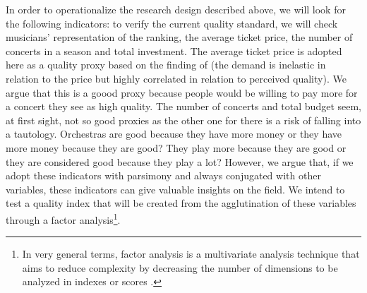 \documentclass[a4paper, 12pt, openright, oneside, german, french, brazil, english, article]{abntex2}
\begin{document}
	
	In order to operationalize the research design described above, we will look for the following indicators: to verify the current quality standard, we will check musicians' representation of the ranking, the average ticket price, the number of concerts in a season and total investment. The average ticket price is adopted here as a quality proxy based on the finding of  (the demand is inelastic in relation to the price but highly correlated in relation to perceived quality). We argue that this is a goood proxy because people would be willing to pay more for a concert they see as high quality. The number of concerts and total budget seem, at first sight, not so good proxies as the other one for there is a risk of falling into a tautology. Orchestras are good because they have more money or they have more money because they are good? They play more because they are good or they are considered good because they play a lot? However, we argue that, if we adopt these indicators with parsimony and always conjugated with other variables, these indicators can give valuable insights on the field. We intend to test a quality index that will be created from the agglutination of these variables through a factor analysis\footnote{In very general terms, factor analysis is a multivariate analysis technique that aims to reduce complexity by decreasing the number of dimensions to be analyzed in indexes or scores \cite{mingoti2005analise}.}.
	
\end{document}
